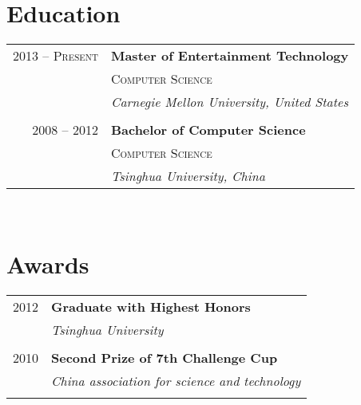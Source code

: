 \documentclass[10pt]{article}
\begin{document}
{\begin{minipage}[t]{0.44\textwidth}
\section{Education} 

\begin{tabular}{rl} %


2013 -- \textsc{Present} & \textbf{Master of Entertainment Technology} \\ 
& \textsc{Computer Science} \\ 
& \textit{Carnegie Mellon University, United States}\\
&\\


2008 -- 2012 & \textbf{Bachelor of Computer Science}\\
& \textsc{Computer Science} \\
& \textit{Tsinghua University, China} 
	

\end{tabular}\\[10pt]


\section{Awards} 

\begin{tabular}{rl}
2012	 & \textbf{Graduate with Highest Honors}\\
& \textit{Tsinghua University}\\ \\


2010	 & \textbf{Second Prize of 7th Challenge Cup}\\
& \textit{China association for science and technology}\\ \\


\end{tabular}
\end{minipage}}
\end{document}
